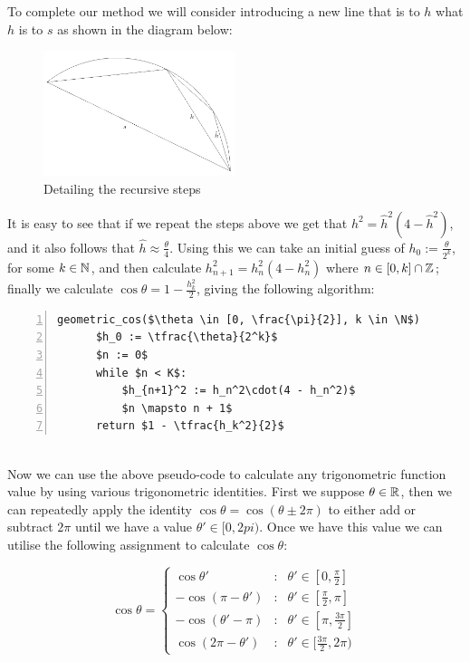 To complete our method we will consider introducing a new line that is to \(h\) what \(h\) is to \(s\) as shown in the diagram below:

\begin{figure}[!ht]
	\label{FIG_"Geometric Trig 3"}
	\caption{Detailing the recursive steps}
	\centering
	\includegraphics[width=0.5\textwidth]{"./Diagrams/Geometric Trig Diagram 3"}
\end{figure}

It is easy to see that if we repeat the steps above we get that \(h^2 = \hat{h}^2(4 - \hat{h}^2)\), and it also follows that \(\hat{h} \approx \frac{\theta}{4}\). Using this we can take an initial guess of \(h_0 := \frac{\theta}{2^k}\), for some \(k \in \mathbb{N}\), and then calculate \(h_{n+1}^2 = h_n^2(4 - h_n^2)\) where \(n \in [0, k] \cap \mathbb{Z}\); finally we calculate \(\cos\theta = 1 - \frac{h_k^2}{2}\), giving the following algorithm:
  
\begin{lstlisting}[numbers=left,frame=single,mathescape,caption={Geometric calculation of \(\cos\)},label={PCD_"Geometric Cos"}]
  geometric_cos($\theta \in [0, \frac{\pi}{2}], k \in \N$)
      $h_0 := \tfrac{\theta}{2^k}$
      $n := 0$
      while $n < K$:
          $h_{n+1}^2 := h_n^2\cdot(4 - h_n^2)$
          $n \mapsto n + 1$
      return $1 - \tfrac{h_k^2}{2}$
\end{lstlisting}\\

Now we can use the above pseudo-code to calculate any trigonometric function value by using various trigonometric identities. First we  suppose \(\theta \in \mathbb{R}\), then we can repeatedly apply the identity \(\cos\theta = \cos(\theta \pm 2\pi)\) to either add or subtract \(2\pi\) until we have a value \(\theta' \in [0, 2pi)\). Once we have this value we can utilise the following assignment to calculate \(\cos\theta\):

\begin{displaymath}
	\cos\theta = \left\{ \begin{array}{lcl}
			\cos\theta' & : & \theta' \in [0, \frac{\pi}{2}]\\
			-\cos(\pi - \theta') & : & \theta' \in [\frac{\pi}{2}, \pi]\\
			-\cos(\theta' - \pi) & : & \theta' \in [\pi, \frac{3\pi}{2}]\\
			\cos(2\pi - \theta') & : & \theta' \in [\frac{3\pi}{2}, 2\pi)
		\end{array}\right.
\end{displaymath}

